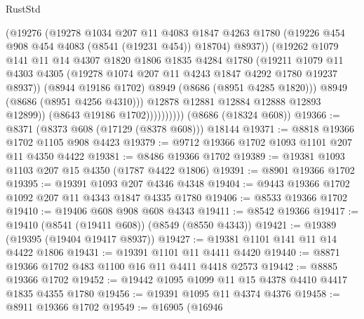 \begin{lexlean}{RustStd}
\begin{coremodule}
                            (@19276
                              (@19278
                                @1034
                                @207
                                @11
                                @4083
                                @1847
                                @4263
                                @1780
                                (@19226 @454 @908 @454 @4083 (@8541 (@19231 @454)) @18704)
                                @8937))
                            (@19262
                              @1079
                              @141
                              @11
                              @14
                              @4307
                              @1820
                              @1806
                              @1835
                              @4284
                              @1780
                              (@19211
                                @1079
                                @11
                                @4303
                                @4305
                                (@19278 @1074 @207 @11 @4243 @1847 @4292 @1780 @19237 @8937))
                              (@8944 @19186 @1702)
                              @8949
                              (@8686 (@8951 @4285 @1820)))
                            @8949
                            (@8686 (@8951 @4256 @4310)))
                          @12878
                          @12881
                          @12884
                          @12888
                          @12893
                          @12899))
                      (@8643 @19186 @1702))))))))))
    (@8686 (@18324 @608))
@19366 := @8371 (@8373 @608 (@17129 (@8378 @608))) @18144
@19371 := @8818 @19366 @1702 @1105 @908 @4423
@19379 := @9712 @19366 @1702 @1093 @1101 @207 @11 @4350 @4422
@19381 := @8486 @19366 @1702
@19389 := @19381 @1093 @1103 @207 @15 @4350 (@1787 @4422 @1806)
@19391 := @8901 @19366 @1702
@19395 := @19391 @1093 @207 @4346 @4348
@19404 := @9443 @19366 @1702 @1092 @207 @11 @4343 @1847 @4335 @1780
@19406 := @8533 @19366 @1702
@19410 := @19406 @608 @908 @608 @4343
@19411 := @8542 @19366
@19417 := @19410 (@8541 (@19411 @608)) (@8549 (@8550 @4343))
@19421 := @19389 (@19395 (@19404 @19417 @8937))
@19427 := @19381 @1101 @141 @11 @14 @4422 @1806
@19431 := @19391 @1101 @11 @4411 @4420
@19440 := @8871 @19366 @1702 @483 @1100 @16 @11 @4411 @4418 @2573
@19442 := @8885 @19366 @1702
@19452 := @19442 @1095 @1099 @11 @15 @4378 @4410 @4417 @1835 @4355 @1780
@19456 := @19391 @1095 @11 @4374 @4376
@19458 := @8911 @19366 @1702
@19549 := @16905
    (@16946

\end{coremodule}
\end{lexlean}
